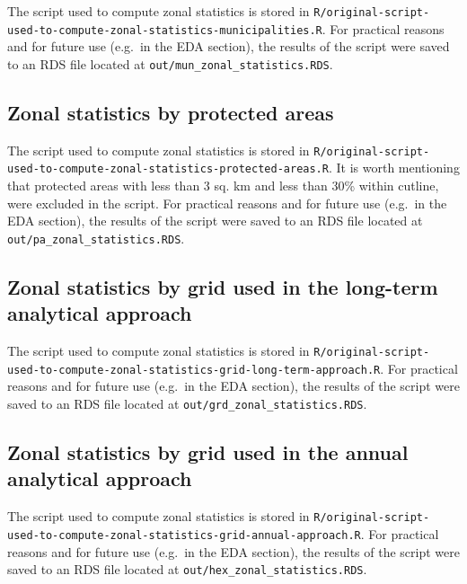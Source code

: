 \documentclass[10pt,landscape,a3paper]{article}
\begin{document}
The script used to compute zonal statistics is stored in
\texttt{R/original-script-used-to-compute-zonal-statistics-municipalities.R}.
For practical reasons and for future use (e.g.~in the EDA section), the
results of the script were saved to an RDS file located at
\texttt{out/mun\_zonal\_statistics.RDS}.

\hypertarget{zonal-statistics-by-protected-areas}{%
\subsection{Zonal statistics by protected
areas}\label{zonal-statistics-by-protected-areas}}

The script used to compute zonal statistics is stored in
\texttt{R/original-script-used-to-compute-zonal-statistics-protected-areas.R}.
It is worth mentioning that protected areas with less than 3 sq. km and
less than 30\% within cutline, were excluded in the script. For
practical reasons and for future use (e.g.~in the EDA section), the
results of the script were saved to an RDS file located at
\texttt{out/pa\_zonal\_statistics.RDS}.

\hypertarget{zonal-statistics-by-grid-used-in-the-long-term-analytical-approach}{%
\subsection{Zonal statistics by grid used in the long-term analytical
approach}\label{zonal-statistics-by-grid-used-in-the-long-term-analytical-approach}}

The script used to compute zonal statistics is stored in
\texttt{R/original-script-used-to-compute-zonal-statistics-grid-long-term-approach.R}.
For practical reasons and for future use (e.g.~in the EDA section), the
results of the script were saved to an RDS file located at
\texttt{out/grd\_zonal\_statistics.RDS}.

\hypertarget{zonal-statistics-by-grid-used-in-the-annual-analytical-approach}{%
\subsection{Zonal statistics by grid used in the annual analytical
approach}\label{zonal-statistics-by-grid-used-in-the-annual-analytical-approach}}

The script used to compute zonal statistics is stored in
\texttt{R/original-script-used-to-compute-zonal-statistics-grid-annual-approach.R}.
For practical reasons and for future use (e.g.~in the EDA section), the
results of the script were saved to an RDS file located at
\texttt{out/hex\_zonal\_statistics.RDS}.
\end{document}
